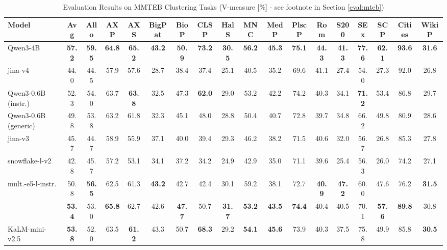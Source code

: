 \documentclass[11pt]{article}
\begin{document}
\begin{table}[H]
\caption{Evaluation Results on MMTEB Clustering Tasks (V-measure [\%] - see footnote in Section \ref{eval:mteb})}
\label{tab:mteb_multilingual_v2_clustering}
\centering
\small
\setlength{\tabcolsep}{1.5pt}
\begin{tabular}{l*{17}{c}}
\toprule
\textbf{Model} & \textbf{Avg} & \textbf{Allo} & \textbf{AXP} & \textbf{AXS} & \textbf{BigPat} & \textbf{BioP} & \textbf{CLSP} & \textbf{HalS} & \textbf{MNC} & \textbf{MedP} & \textbf{PlscP} & \textbf{Rom} & \textbf{S200} & \textbf{SEx} & \textbf{SCP} & \textbf{Cities} & \textbf{WikiP} \\
\midrule
Qwen3-4B & \textbf{57.2} & \textbf{59.5} & \textbf{64.8} & \textbf{65.2} & \textbf{43.2} & \textbf{50.9} & \textbf{73.2} & \textbf{30.5} & \textbf{56.2} & \textbf{45.3} & \textbf{75.1} & \textbf{44.3} & \textbf{41.3} & \textbf{77.6} & \textbf{62.1} & \textbf{93.6} & \textbf{31.6} \\
jina-v4 & 44.0 & 44.5 & 57.9 & 57.6 & 28.7 & 38.4 & 37.4 & 25.1 & 40.5 & 35.2 & 69.6 & 41.1 & 27.4 & 54.0 & 27.3 & 92.0 & 26.8 \\
\midrule
Qwen3-0.6B (instr.) & 52.3 & 54.0 & 63.7 & \textbf{63.8} & 32.5 & 47.3 & \textbf{62.0} & 29.0 & 53.2 & 42.2 & 74.2 & 40.3 & 34.1 & \textbf{71.2} & 53.4 & 86.8 & 29.7 \\
Qwen3-0.6B (generic) & 49.8 & 53.8 & 63.2 & 61.8 & 32.3 & 45.1 & 48.0 & 28.8 & 50.4 & 40.7 & 72.8 & 39.7 & 34.8 & 66.2 & 49.8 & 80.9 & 28.6 \\
jina-v3 & 45.7 & 44.7 & 58.9 & 55.9 & 37.1 & 40.0 & 39.4 & 29.3 & 46.2 & 38.2 & 71.5 & 40.6 & 32.0 & 56.7 & 26.8 & 85.3 & 27.8 \\
snowflake-l-v2 & 42.8 & 45.7 & 57.2 & 53.1 & 34.1 & 37.2 & 34.2 & 24.9 & 42.9 & 35.0 & 71.1 & 39.6 & 25.4 & 56.3 & 26.0 & 74.2 & 27.1 \\
mult.-e5-l-instr. & 50.8 & \textbf{56.5} & 62.5 & 61.3 & \textbf{43.2} & 42.7 & 42.4 & 30.1 & 59.2 & 38.1 & 72.7 & \textbf{40.9} & \textbf{47.2} & 60.0 & 47.6 & 76.2 & \textbf{31.5} \\
\JEmbeddingVFiveTextSmallShort{} & \textbf{53.4} & 53.0 & \textbf{65.8} & 62.7 & 42.6 & \textbf{47.7} & 50.7 & \textbf{31.7} & \textbf{53.2} & \textbf{43.5} & \textbf{74.4} & 40.4 & 40.5 & 70.1 & \textbf{57.6} & \textbf{89.8} & 30.8 \\
\midrule
KaLM-mini-v2.5 & \textbf{53.8} & 52.0 & 63.5 & \textbf{61.2} & 43.3 & 50.7 & \textbf{68.3} & 29.2 & \textbf{54.1} & \textbf{45.6} & 73.9 & 40.3 & 37.5 & 75.8 & 49.9 & 85.8 & \textbf{30.5} \\

\end{tabular}
\end{table}
\end{document}
